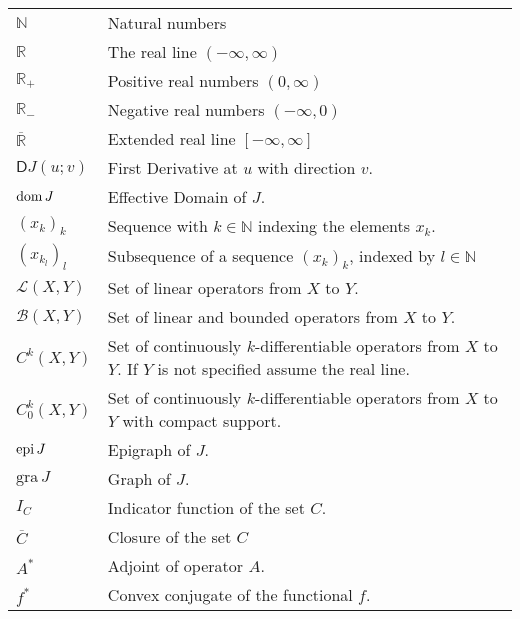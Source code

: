 \begin{tabular}{ll}
	$\mathbb{N}$ & Natural numbers \\
	$\mathbb{R}$ & The real line $(-\infty, \infty)$ \\
	$\mathbb{R}_+$ & Positive real numbers $(0,\infty)$ \\
	$\mathbb{R}_-$ & Negative real numbers $(-\infty,0)$ \\
	$\overline{\mathbb{R}}$ & Extended real line $[-\infty, \infty]$ \\
	$\mathsf{D} J(u;v)$ & First Derivative at $u$ with direction $v$. \\
	$\mathrm{dom\,} J$	& Effective Domain of $J$. \\
	$(x_k)_k$   & Sequence with $k \in \mathbb{N}$ indexing the elements $x_k$. \\
	$(x_{k_l})_l$ & Subsequence of a sequence $(x_k)_k$, indexed by $l \in \mathbb{N}$ \\
	$\mathcal{L}(X,Y)$ & Set of linear operators from $X$ to $Y$. \\
	$\mathcal{B}(X,Y)$ & Set of linear and bounded operators from $X$ to $Y$. \\
	$C^k(X,Y)$ & Set of continuously $k$-differentiable operators from $X$ to $Y$. If $Y$ is not specified assume the real line. \\
	$C^k_0(X,Y)$ & Set of continuously $k$-differentiable operators from $X$ to $Y$ with compact support. \\
	$\mathrm{epi\,} J$ & Epigraph of $J$. \\
	$\text{gra}\, J$ & Graph of $J$.\\
	$I_C$ & Indicator function of the set $C$. \\
	$\overline{C}$ & Closure of  the set $C$ \\
	$A^*$ & Adjoint of operator $A$.\\
	$f^*$ & Convex conjugate of the functional $f$.
\end{tabular}